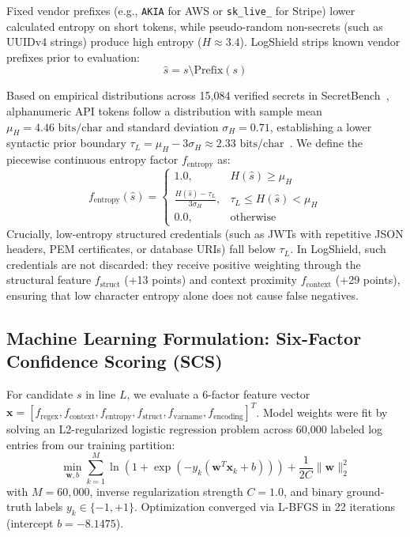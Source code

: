 \documentclass[conference]{IEEEtran}
\begin{document}
Fixed vendor prefixes (e.g., \texttt{AKIA} for AWS or \texttt{sk\_live\_} for Stripe) lower calculated entropy on short tokens, while pseudo-random non-secrets (such as UUIDv4 strings) produce high entropy ($H \approx 3.4$). LogShield strips known vendor prefixes prior to evaluation:
\begin{equation}
    \hat{s} = s \setminus \text{Prefix}(s)
\end{equation}

Based on empirical distributions across 15,084 verified secrets in SecretBench~\cite{basak2023secretbench}, alphanumeric API tokens follow a distribution with sample mean $\mu_H = 4.46\text{ bits/char}$ and standard deviation $\sigma_H = 0.71$, establishing a lower syntactic prior boundary $\tau_L = \mu_H - 3\sigma_H \approx 2.33\text{ bits/char}$~\cite{huang2024your}. We define the piecewise continuous entropy factor $f_{\text{entropy}}$ as:
\begin{equation}
    f_{\text{entropy}}(\hat{s}) = \begin{cases}
    1.0, & H(\hat{s}) \ge \mu_H \\
    \frac{H(\hat{s}) - \tau_L}{3\sigma_H}, & \tau_L \le H(\hat{s}) < \mu_H \\
    0.0, & \text{otherwise}
    \end{cases}
\end{equation}
Crucially, low-entropy structured credentials (such as JWTs with repetitive JSON headers, PEM certificates, or database URIs) fall below $\tau_L$. In LogShield, such credentials are not discarded: they receive positive weighting through the structural feature $f_{\text{struct}}$ (+13 points) and context proximity $f_{\text{context}}$ (+29 points), ensuring that low character entropy alone does not cause false negatives.

\subsection{Machine Learning Formulation: Six-Factor Confidence Scoring (SCS)}
For candidate $s$ in line $L$, we evaluate a 6-factor feature vector $\mathbf{x} = [f_{\text{regex}}, f_{\text{context}}, f_{\text{entropy}}, f_{\text{struct}}, f_{\text{varname}}, f_{\text{encoding}}]^T$. Model weights were fit by solving an L2-regularized logistic regression problem across 60,000 labeled log entries from our training partition:
\begin{equation}
    \min_{\mathbf{w}, b} \sum_{k=1}^{M} \ln\left(1 + \exp\left(-y_k (\mathbf{w}^T \mathbf{x}_k + b)\right)\right) + \frac{1}{2C} \|\mathbf{w}\|_2^2
\end{equation}
with $M=60,000$, inverse regularization strength $C=1.0$, and binary ground-truth labels $y_k \in \{-1, +1\}$. Optimization converged via L-BFGS in 22 iterations (intercept $b = -8.1475$). 
\end{document}
